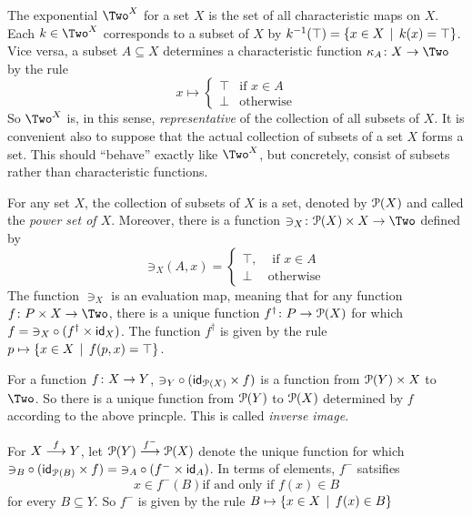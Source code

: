 The exponential $\Two^X$ for a set $X$ is the set of all characteristic maps on $X$.
Each $k\in \Two^X$ corresponds to a subset of $X$ by $k^{-1}(\top) = \{x\in X\st k(x)=\top\}$. Vice versa, a subset $A\subseteq X$ determines a characteristic function $\fromto {\kappa_A}X\Two$ by the rule
\[x\mapsto \begin{cases}
			\top &\text{if $x\in A$}\\
			\bot &\text{otherwise}
\end{cases}
\]
So $\Two^X$ is, in this sense, \emph{representative} of the collection of all subsets of $X$. 
It is convenient also to suppose that the actual collection of subsets of a set $X$ forms a set.
This should ``behave'' exactly like $\Two^X$, but concretely, consist of subsets rather than characteristic functions.

\begin{principle}\label{ax:powerset}
	For any set $X$, the collection of subsets of $X$ is a set, denoted by $\powerset(X)$ and called the \emph{power set of $X$}. 
	Moreover, there is a function $\fromto {\ni_X}{\powerset(X)\times X}\Two$ defined by
	\[{\mathord\ni}_X(A,x) = \begin{cases}
	\top, &\text{ if } x\in A\\
	\bot &\text{otherwise}
	\end{cases}
	\]
	The function $\ni_X$ is an evaluation map, meaning that 
	for any function $\fromto f{P\times X}\Two$, there is a unique function $\fromto {f^\dagger}P{\powerset(X)}$ for which $f = {\mathord\ni}_X\circ (f^\dagger \times \id_X)$. The function $f^\dagger$ 
	is given by the rule $p\mapsto \{x\in X\st f(p,x)=\top\}$.
\end{principle}

For a function $\fromto fXY$, ${\mathord\ni}_Y\circ (\id_{\powerset(X)}\times f)$ is a function from $\powerset(Y)\times X$ to $\Two$. So there is a unique function
from $\powerset(Y)$ to $\powerset(X)$ determined by $f$ according to the above princple.
This is called \emph{inverse image}.

\begin{defn}
	For $\sfromto fXY$, let $\sfromto {f^-}{\powerset(Y)}{\powerset(X)}$ denote
	the unique function for which ${\mathord\ni}_B\circ (\id_{\powerset(B)}\times f) = {\mathord\ni}_A\circ(f^-\times \id_A)$. In terms of elements, $f^-$ satsifies
	\[x\in f^-(B) \text{if and only if } f(x)\in B\]
	for every $B\subseteq Y$.  So $f^-$ is given by the rule $B\mapsto \{x\in X\st f(x)\in B\}$
\end{defn}

